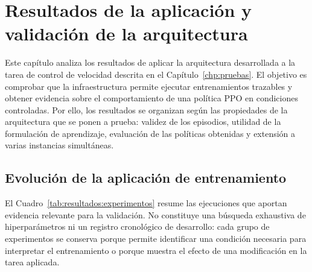 \chapter{Resultados de la aplicación y validación de la arquitectura} \label{chp:resultados}

Este capítulo analiza los resultados de aplicar la arquitectura desarrollada a la
tarea de control de velocidad descrita en el Capítulo~\ref{chp:pruebas}. El
objetivo es comprobar que la infraestructura permite ejecutar entrenamientos
trazables y obtener evidencia sobre el comportamiento de una política PPO en
condiciones controladas. Por ello, los resultados se organizan según las
propiedades de la arquitectura que se ponen a prueba: validez de los episodios, utilidad
de la formulación de aprendizaje, evaluación de las políticas obtenidas y
extensión a varias instancias simultáneas.

\section{Evolución de la aplicación de entrenamiento} \label{sct:resultados:evolucion}

El Cuadro~\ref{tab:resultados:experimentos} resume las ejecuciones que aportan
evidencia relevante para la validación. No constituye una búsqueda exhaustiva de
hiperparámetros ni un registro cronológico de desarrollo: cada grupo de
experimentos se conserva porque permite identificar una condición necesaria para
interpretar el entrenamiento o porque muestra el efecto de una modificación en
la tarea aplicada.

